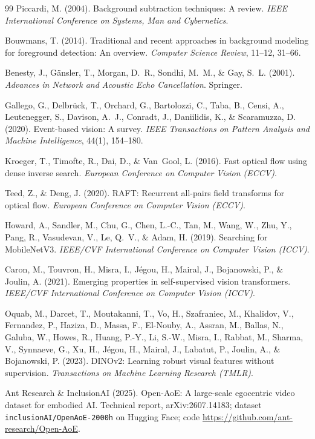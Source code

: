 \documentclass[12pt,a4paper]{article}
\begin{document}
\begin{thebibliography}{99}
Piccardi, M. (2004).
Background subtraction techniques: A review.
\emph{IEEE International Conference on Systems, Man and Cybernetics}.

Bouwmans, T. (2014).
Traditional and recent approaches in background modeling for foreground detection: An overview.
\emph{Computer Science Review}, 11--12, 31--66.

Benesty, J., G{\"a}nsler, T., Morgan, D.~R., Sondhi, M.~M., \& Gay, S.~L. (2001).
\emph{Advances in Network and Acoustic Echo Cancellation}.
Springer.

Gallego, G., Delbr{\"u}ck, T., Orchard, G., Bartolozzi, C., Taba, B., Censi, A., Leutenegger, S., Davison, A.~J., Conradt, J., Daniilidis, K., \& Scaramuzza, D. (2020).
Event-based vision: A survey.
\emph{IEEE Transactions on Pattern Analysis and Machine Intelligence}, 44(1), 154--180.

Kroeger, T., Timofte, R., Dai, D., \& Van~Gool, L. (2016).
Fast optical flow using dense inverse search.
\emph{European Conference on Computer Vision (ECCV)}.

Teed, Z., \& Deng, J. (2020).
RAFT: Recurrent all-pairs field transforms for optical flow.
\emph{European Conference on Computer Vision (ECCV)}.

Howard, A., Sandler, M., Chu, G., Chen, L.-C., Tan, M., Wang, W., Zhu, Y., Pang, R., Vasudevan, V., Le, Q.~V., \& Adam, H. (2019).
Searching for MobileNetV3.
\emph{IEEE/CVF International Conference on Computer Vision (ICCV)}.

Caron, M., Touvron, H., Misra, I., J{\'e}gou, H., Mairal, J., Bojanowski, P., \& Joulin, A. (2021).
Emerging properties in self-supervised vision transformers.
\emph{IEEE/CVF International Conference on Computer Vision (ICCV)}.

Oquab, M., Darcet, T., Moutakanni, T., Vo, H., Szafraniec, M., Khalidov, V., Fernandez, P., Haziza, D., Massa, F., El-Nouby, A., Assran, M., Ballas, N., Galuba, W., Howes, R., Huang, P.-Y., Li, S.-W., Misra, I., Rabbat, M., Sharma, V., Synnaeve, G., Xu, H., J{\'e}gou, H., Mairal, J., Labatut, P., Joulin, A., \& Bojanowski, P. (2023).
DINOv2: Learning robust visual features without supervision.
\emph{Transactions on Machine Learning Research (TMLR)}.

Ant Research \& InclusionAI (2025).
Open-AoE: A large-scale egocentric video dataset for embodied AI.
Technical report, arXiv:2607.14183;
dataset \texttt{inclusionAI/OpenAoE-2000h} on Hugging Face;
code \url{https://github.com/ant-research/Open-AoE}.


\end{thebibliography}
\end{document}
